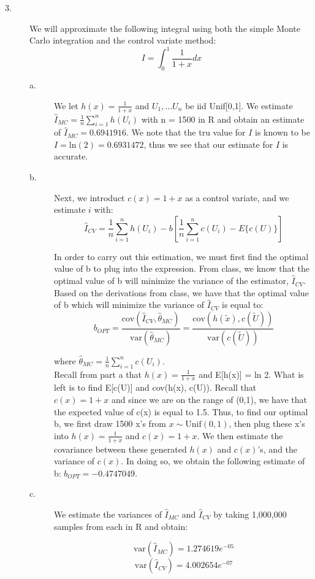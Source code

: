 \documentclass[12pt]{article}
\begin{document}
\begin{description}
\item[3.] We will approximate the following integral using both the simple Monte Carlo integration and the control variate method:
\[I = \int_0^1 \frac{1}{1 + x} dx\]

\begin{description}
\item[a.]We let $h(x) = \frac{1}{1+x}$ and $U_1, \dots U_n$ be iid Unif[0,1]. We estimate $\hat{I}_{MC} = \frac{1}{n} \sum_{i = 1}^n h(U_i)$ with n = 1500 in R and obtain an estimate of $\hat{I}_{MC} = 0.6941916$. We note that the tru value for $I$ is known to be $I = \mathrm{ln}(2) = 0.6931472$, thus we see that our estimate for $I$ is accurate. 
\item[b.] Next, we introduct $c(x) = 1 + x$ as a control variate, and we estimate $i$ with:
\[\hat{I}_{CV} = \frac{1}{n} \sum_{i = 1}^n h(U_i) - b \left[ \frac{1}{n} \sum_{i = 1}^n c(U_i) - E\{c(U)\} \right]\]

In order to carry out this estimation, we must first find the optimal value of b to plug into the expression. From class, we know that the optimal value of b will minimize the variance of the estimator, $\hat{I}_{CV}$. Based on the derivations from class, we have that the optimal value of b which will minimize the variance of  $\hat{I}_{CV}$ is equal to:
\[b_{OPT} = \frac{\mathrm{cov}(\hat{I}_{CV}, \hat{\theta}_{MC})}{\mathrm{var}(\hat{\theta}_{MC})} = \frac{\mathrm{cov}(h(\tilde{x}), c(\tilde{U}))}{\mathrm{var}(c(\tilde{U}))} \]

where $\hat{\theta}_{MC} = \frac{1}{n} \sum_{i = 1}^n c(U_i)$.\\

Recall from part a that $h(x)  = \frac{1}{1 + x}$ and E[h(x)] = ln 2. What is left is to find E[c(U)] and cov(h(x), c(U)). Recall that $c(x) = 1 + x$ and since we are on the range of (0,1), we have that the expected value of c(x) is equal to 1.5. Thus, to find our optimal b, we first draw 1500 x's from $x \sim \mathrm{Unif}(0, 1)$, then plug these x's into $h(x) = \frac{1}{1 + x}$ and $c(x) = 1 + x$. We then estimate the covariance between these generated $h(x)$ and $c(x)$'s, and the variance of $c(x)$. In doing so, we obtain the following estimate of b: $b_{OPT} = -0.4747049$. 
\item[c.] We estimate the variances of $\hat{I}_{MC}$ and $\hat{I}_{CV}$ by taking 1,000,000 samples from each in R and obtain:

 \[\mathrm{var}(\hat{I}_{MC}) = 1.274619e^{-05}\] 
\[\mathrm{var}(\hat{I}_{CV}) = 4.002654e^{-07}\]


\end{description}
\end{description}
\end{document}
